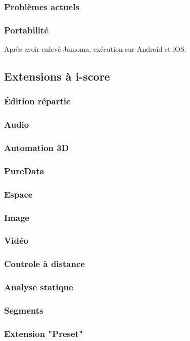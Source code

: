 \documentclass[french,a4paper]{book}
\begin{document}
\subsubsection{Problèmes actuels}
\subsubsection{Portabilité}
Après avoir enlevé Jamoma, exécution sur Android et iOS.
    
\subsection{Extensions à i-score}
\subsubsection{Édition répartie}
\subsubsection{Audio}
\subsubsection{Automation 3D}
\subsubsection{PureData}
\subsubsection{Espace}
\subsubsection{Image}
\subsubsection{Vidéo}
\subsubsection{Controle à distance}
\subsubsection{Analyse statique}
\subsubsection{Segments}
\subsubsection{Extension "Preset"}
\end{document}
